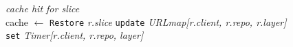 \begin{algorithm}
{			
			{
				\emph{cache hit for slice} \\
			} 
			{
				cache $\gets$ \texttt{Restore} \emph{r.slice} 
			}
		}
		\texttt{update} \emph{URLmap[r.client, r.repo, r.layer]} \\
		\texttt{set} \emph{Timer[r.client, r.repo, layer]} \\

%

\end{algorithm}


